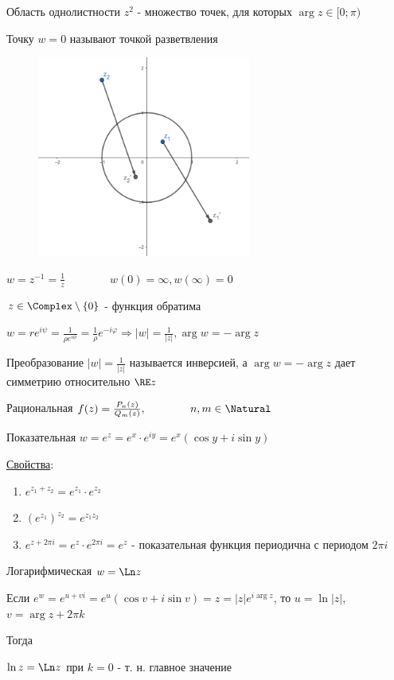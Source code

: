 Область однолистности $z^2$ - множество точек, для которых $\arg z \in [0; \pi)$

Точку $w = 0$ называют точкой разветвления


\begin{figure}
    \includegraphics[width=7cm]{addchapters2/images/addchapters2_2025_02_21_1}
\end{figure}

\Exs $w = z^{-1} = \frac{1}{z} \qquad\qquad w(0) = \infty, w(\infty) = 0$

$z \in \Complex \setminus \{0\}$ - функция обратима

$w = re^{i\psi} = \frac{1}{\rho e^{i\phi}} = \frac{1}{\rho} e^{-i\varphi} \Longrightarrow |w| = \frac{1}{|z|}, \arg w = -\arg z$

Преобразование $|w| = \frac{1}{|z|}$ называется инверсией, а $\arg w = -\arg z$ дает симметрию относительно $\RE z$

 Рациональная $f(z) = \frac{P_n(z)}{Q_m(z)}, \qquad\qquad n, m \in \Natural$

 Показательная $w = e^z = e^x \cdot e^{iy} = e^x (\cos y + i \sin y)$

\underline{Свойства}: 

\begin{enumerate}
    \item $e^{z_1 + z_2} = e^{z_1} \cdot e^{z_2}$
    \item $\left(e^{z_1}\right)^{z_2} = e^{z_1 z_2}$
    \item $e^{z + 2\pi i} = e^{z} \cdot e^{2\pi i} = e^z$ - показательная функция периодична с периодом $2\pi i$
\end{enumerate}

 Логарифмическая $w = \Ln z$

Если $e^w = e^{u + vi} = e^u (\cos v + i \sin v) = z = |z| e^{i\arg z}$, то $u = \ln |z|$, $v = \arg z + 2\pi k$

Тогда 

$\ln z = \Ln z$ при $k = 0$ - т. н. главное значение




